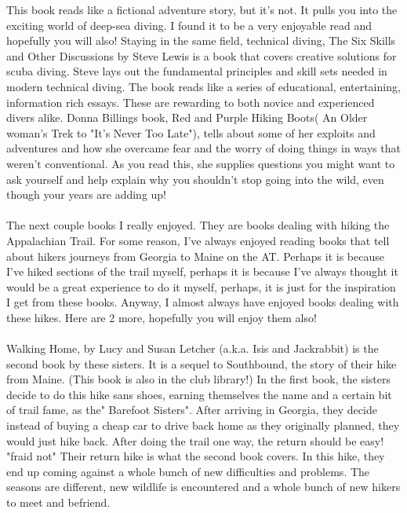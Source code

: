 \documentclass[10pt,a4paper]{article}
\begin{document}
	
	This book reads like a fictional adventure story, but it's not.  It pulls you into the exciting world of deep-sea diving.  I found it to be a very enjoyable read and hopefully you will also!
	Staying in the same field, technical diving, The Six Skills and Other Discussions by Steve Lewis is a book that covers creative solutions for scuba diving.  Steve lays out the fundamental principles and skill sets needed in modern  technical diving.  The book reads like a series of educational, entertaining, information rich essays.  These are rewarding to both novice and experienced divers alike.
	Donna Billings book, Red and Purple Hiking Boots( An Older woman's Trek to "It's Never Too Late"), tells about some of her exploits and adventures and how she overcame fear and the worry of doing things in ways that weren't conventional.  As you read this, she supplies questions you might want to ask yourself and help explain why you shouldn't stop going into the wild, even though your years are adding up!
\\
\\
	The next couple books I really enjoyed.  They are books dealing with hiking the Appalachian Trail.  For some reason, I've always enjoyed reading books that tell about hikers journeys from Georgia to Maine on the AT.  Perhaps it is because I've hiked sections of the trail myself, perhaps it is because I've always thought it would be a great experience to do it myself, perhaps, it is just for the inspiration I get from these books.   Anyway, I almost always have enjoyed books dealing with these hikes.  Here are 2 more, hopefully you will enjoy them also!
\\
\\	
	Walking Home, by Lucy and Susan Letcher (a.k.a. Isis and Jackrabbit) is the second book by these sisters.  It is a sequel to Southbound, the story of their hike from Maine. (This book is also in the club library!) In the first book, the sisters decide to do this hike sans shoes, earning themselves the name and a certain bit of  trail fame, as the" Barefoot Sisters".   After arriving in Georgia, they decide instead of buying a cheap car to drive back home as they originally planned, they would just hike back.  After doing the trail one way, the return should be easy!  "fraid not" Their return hike is what the second book covers.  In this hike, they end up coming against a whole bunch of new difficulties and problems.  The seasons are different, new wildlife is encountered and a whole bunch of new hikers to meet and befriend.  
\\
\end{document}
